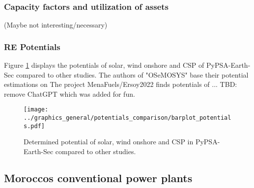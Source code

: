 \subsubsection{Capacity factors and utilization of assets}
(Maybe not interesting/necessary)


\subsubsection{RE Potentials}
Figure \ref{fig:potentials} displays the potentials of solar, wind onshore and CSP 
of PyPSA-Earth-Sec compared to other studies. The authors of "OSeMOSYS" 
\cite{Cannone2021} base their potential estimations on \cite[primary: 13,18,19]{Cannone2021}
The project MenaFuels/Ersoy2022 \cite{Ersoy2022} finds potentials of ...
TBD: remove ChatGPT which was added for fun.

\begin{figure}[h!]
    \centering
    \texttt{[image: ../graphics\_general/potentials\_comparison/barplot\_potentials.pdf]}
    \caption{Determined potential of solar, wind onshore and CSP in PyPSA-Earth-Sec compared to other studies.}
    \label{fig:potentials}
\end{figure}


\subsection{Moroccos conventional power plants}

\clearpage
\onecolumn
\begin{footnotesize}
    
\end{footnotesize}
\clearpage
\twocolumn